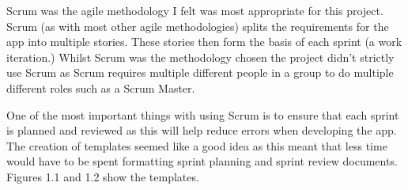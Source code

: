 Scrum was the agile methodology I felt was most appropriate for this project. Scrum (as with most other agile methodologies) splits the requirements for the app into multiple stories. These stories then form the basis of each sprint (a work iteration.) Whilst Scrum was the methodology chosen the project didn't strictly use Scrum as Scrum requires multiple different people in a group to do multiple different roles such as a Scrum Master. 

One of the most important things with using Scrum is to ensure that each sprint is planned and reviewed as this will help reduce errors when developing the app. The creation of templates seemed like a good idea as this meant that less time would have to be spent formatting sprint planning and sprint review documents. Figures 1.1 and 1.2 show the templates.

